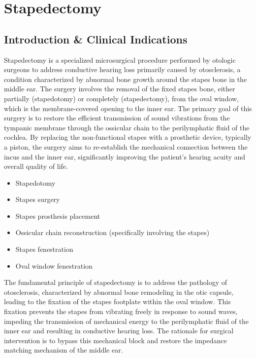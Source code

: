 \chapter{Stapedectomy}

\section*{Introduction \& Clinical Indications}
Stapedectomy is a specialized microsurgical procedure performed by otologic surgeons to address conductive hearing loss primarily caused by otosclerosis, a condition characterized by abnormal bone growth around the stapes bone in the middle ear. The surgery involves the removal of the fixed stapes bone, either partially (stapedotomy) or completely (stapedectomy), from the oval window, which is the membrane-covered opening to the inner ear. The primary goal of this surgery is to restore the efficient transmission of sound vibrations from the tympanic membrane through the ossicular chain to the perilymphatic fluid of the cochlea. By replacing the non-functional stapes with a prosthetic device, typically a piston, the surgery aims to re-establish the mechanical connection between the incus and the inner ear, significantly improving the patient's hearing acuity and overall quality of life.

\begin{itemize}
  \item Stapedotomy
  \item Stapes surgery
  \item Stapes prosthesis placement
  \item Ossicular chain reconstruction (specifically involving the stapes)
  \item Stapes fenestration
  \item Oval window fenestration
\end{itemize}

The fundamental principle of stapedectomy is to address the pathology of otosclerosis, characterized by abnormal bone remodeling in the otic capsule, leading to the fixation of the stapes footplate within the oval window. This fixation prevents the stapes from vibrating freely in response to sound waves, impeding the transmission of mechanical energy to the perilymphatic fluid of the inner ear and resulting in conductive hearing loss. The rationale for surgical intervention is to bypass this mechanical block and restore the impedance matching mechanism of the middle ear.


